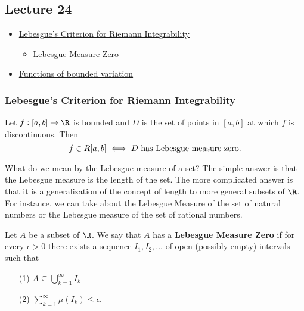 \subsection{Lecture 24}

\begin{itemize}
    \item {\hyperref[Lebesgue's Criterion for Riemann Integrability]{Lebesgue's Criterion for Riemann Integrability}} 
        \begin{itemize}
            \item {\hyperref[Lebesgue Measure Zero]{Lebesgue Measure Zero}} 
        \end{itemize}
    \item {\hyperref[Functions of bounded variation]{Functions of bounded variation}}  
\end{itemize}

\subsubsection{Lebesgue's Criterion for Riemann Integrability}

\begin{theorem}\label{Lebesgue's Criterion for Riemann Integrability}
    Let \( f: [a,b] \to \R   \) is bounded and \( D  \) is the set of points in \( [a,b] \) at which \( f  \) is discontinuous. Then 
    \[  f \in R[a,b] \iff \text{\( D  \) has Lebesgue measure zero}. \]
\end{theorem}

What do we mean by the Lebesgue measure of a set? The simple answer is that the Lebesgue measure is the length of the set. The more complicated answer is that it is a generalization of the concept of length to more general subsets of \( \R  \). For instance, we can take about the Lebesgue Measure of the set of natural numbers or the Lebesgue measure of the set of rational numbers. 

\begin{definition}\label{Lebesgue Measure Zero}
    Let \( A  \) be a subset of \( \R  \). We say that \( A  \) has a \textbf{Lebesgue Measure Zero} if for every \( \epsilon > 0  \) there exists a sequence \( {I}_{1}, {I}_{2}, \dots  \) of open (possibly empty) intervals such that  
    \begin{enumerate}
        \item[(1)] \( A \subseteq  \bigcup_{ k = 1  }^{ \infty  }  {I}_{k } \)
        \item[(2)] \( \displaystyle \sum_{ k=1  }^{ \infty  } \mu({I}_{k}) \leq \epsilon \).
    \end{enumerate}
\end{definition}

